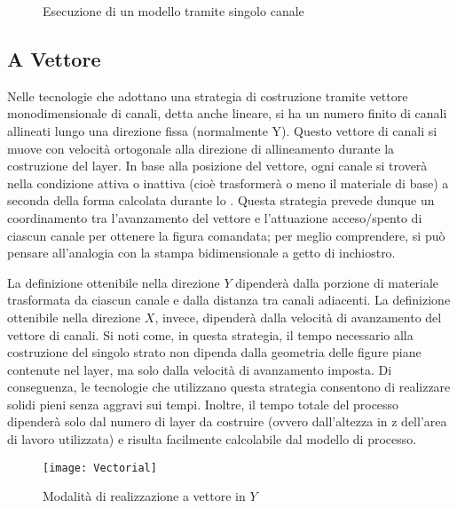 \begin{figure}
\centering
{}\quad
{}
\caption{Esecuzione di un modello tramite singolo canale}
\label{fig:SingCanale}
\end{figure}

\subsection{A Vettore}
Nelle tecnologie che adottano una strategia di costruzione tramite vettore monodimensionale di canali, detta anche lineare, si ha un numero finito di canali allineati lungo una direzione fissa (normalmente Y).
Questo vettore di canali si muove con velocità ortogonale alla direzione di allineamento durante la costruzione del layer.
In base alla posizione del vettore, ogni canale si troverà nella condizione attiva o inattiva (cioè trasformerà o meno il materiale di base) a seconda della forma calcolata durante lo .
Questa strategia prevede dunque un coordinamento tra l'avanzamento del vettore e l'attuazione acceso/spento di ciascun canale per ottenere la figura comandata; per meglio comprendere, si può pensare all'analogia con la stampa bidimensionale a getto di inchiostro.

La definizione ottenibile nella direzione $Y$ dipenderà dalla porzione di materiale trasformata da ciascun canale e dalla distanza tra canali adiacenti.
La definizione ottenibile nella direzione $X$, invece, dipenderà dalla velocità di avanzamento del vettore di canali.
Si noti come, in questa strategia, il tempo necessario alla costruzione del singolo strato non dipenda dalla geometria delle figure piane contenute nel layer, ma solo dalla velocità di avanzamento imposta.
Di conseguenza, le tecnologie che utilizzano questa strategia consentono di realizzare solidi pieni senza aggravi sui tempi.
Inoltre, il tempo totale del processo dipenderà solo dal numero di layer da costruire (ovvero dall'altezza in z dell'area di lavoro utilizzata) e risulta facilmente calcolabile dal modello di processo.
\begin{figure}
\centering
\texttt{[image: Vectorial]}
\caption{Modalità di realizzazione a vettore in $Y$}
\label{fig:Vectorial}
\end{figure}

